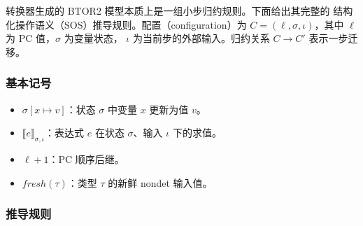 \documentclass[11pt,a4paper]{article}
\newcommand{\eval}[1]{\llbracket #1 \rrbracket}
\begin{document}
转换器生成的 BTOR2 模型本质上是一组小步归约规则。下面给出其完整的
结构化操作语义（SOS）推导规则。配置（configuration）为
$C = (\ell, \sigma, \iota)$，其中 $\ell$ 为 PC 值，$\sigma$ 为变量状态，
$\iota$ 为当前步的外部输入。归约关系 $C \to C'$ 表示一步迁移。

\subsubsection*{基本记号}

\begin{itemize}
  \item $\sigma[x \mapsto v]$：状态 $\sigma$ 中变量 $x$ 更新为值 $v$。
  \item $\eval{e}_{\sigma,\iota}$：表达式 $e$ 在状态 $\sigma$、输入 $\iota$ 下的求值。
  \item $\ell{+}1$：PC 顺序后继。
  \item $\mathit{fresh}(\tau)$：类型 $\tau$ 的新鲜 nondet 输入值。
\end{itemize}

\subsubsection*{推导规则}
\end{document}
